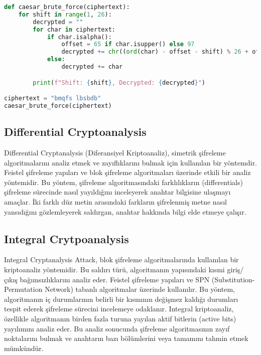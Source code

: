 \begin{lstlisting}[language=Python]
def caesar_brute_force(ciphertext):
    for shift in range(1, 26):
        decrypted = ""
        for char in ciphertext:
            if char.isalpha():
                offset = 65 if char.isupper() else 97
                decrypted += chr((ord(char) - offset - shift) % 26 + offset)
            else:
                decrypted += char

        print(f"Shift: {shift}, Decrypted: {decrypted}")

ciphertext = "bmqfs lbsbdb"
caesar_brute_force(ciphertext)
\end{lstlisting}

\newpage

\subsection{Differential Cryptoanalysis}

Differential Cryptanalysis (Diferansiyel Kriptoanaliz), simetrik şifreleme algoritmalarını analiz etmek ve zayıflıklarını bulmak için kullanılan bir yöntemdir. Feistel şifreleme yapıları ve blok şifreleme algoritmaları üzerinde etkili bir analiz yöntemidir. Bu yöntem, şifreleme algoritmasındaki farklılıkların (differentials) şifreleme sürecinde nasıl yayıldığını inceleyerek anahtar bilgisine ulaşmayı amaçlar. İki farklı düz metin arasındaki farkların şifrelenmiş metne nasıl yansıdığını gözlemleyerek saldırgan, anahtar hakkında bilgi elde etmeye çalışır.

\newpage

\subsection{Integral Crytpoanalysis}

Integral Cryptanalysis Attack, blok şifreleme algoritmalarında kullanılan bir kriptoanaliz yöntemidir. Bu saldırı türü, algoritmanın yapısındaki kısmi giriş/çıkış bağımsızlıklarını analiz eder. Feistel şifreleme yapıları ve SPN (Substitution-Permutation Network) tabanlı algoritmalar üzerinde kullanılır. Bu yöntem, algoritmanın iç durumlarının belirli bir kısmının değişmez kaldığı durumları tespit ederek şifreleme sürecini incelemeye odaklanır. Integral kriptoanaliz, özellikle algoritmanın birden fazla turuna yayılan aktif bitlerin (active bits) yayılımını analiz eder. Bu analiz sonucunda şifreleme algoritmasının zayıf noktalarını bulmak ve anahtarın bazı bölümlerini veya tamamını tahmin etmek mümkündür.

\newpage